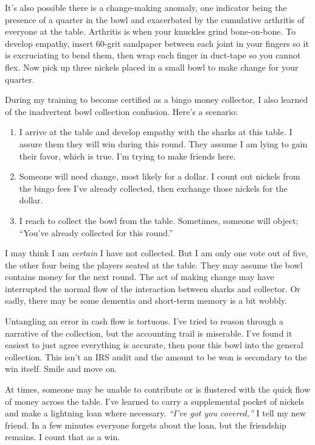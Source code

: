 \documentclass[
  letterpaper,
  DIV=11,
  numbers=noendperiod]{scrartcl}
\begin{document}
It's also possible there is a change-making anomaly, one indicator being
the presence of a quarter in the bowl and exacerbated by the cumulative
arthritis of everyone at the table. Arthritis is when your knuckles
grind bone-on-bone. To develop empathy, insert 60-grit sandpaper between
each joint in your fingers so it is excruciating to bend them, then wrap
each finger in duct-tape so you cannot flex. Now pick up three nickels
placed in a small bowl to make change for your quarter.

During my training to become certified as a bingo money collector, I
also learned of the inadvertent bowl collection confusion. Here's a
scenario:

\begin{enumerate}
\def\labelenumi{\arabic{enumi}.}
\item
  I arrive at the table and develop empathy with the sharks at this
  table. I assure them they will win during this round. They assume I am
  lying to gain their favor, which is true. I'm trying to make friends
  here.
\item
  Someone will need change, most likely for a dollar. I count out
  nickels from the bingo fees I've already collected, then exchange
  those nickels for the dollar.
\item
  I reach to collect the bowl from the table. Sometimes, someone will
  object; ``You've already collected for this round.''
\end{enumerate}

I may think I am \emph{certain} I have not collected. But I am only one
vote out of five, the other four being the players seated at the table.
They may assume the bowl contains money for the next round. The act of
making change may have interrupted the normal flow of the interaction
between sharks and collector. Or sadly, there may be some dementia and
short-term memory is a bit wobbly.

Untangling an error in cash flow is tortuous. I've tried to reason
through a narrative of the collection, but the accounting trail is
miserable. I've found it easiest to just agree everything is accurate,
then pour this bowl into the general collection. This isn't an IRS audit
and the amount to be won is secondary to the win itself. Smile and move
on.

At times, someone may be unable to contribute or is flustered with the
quick flow of money across the table. I've learned to carry a
supplemental pocket of nickels and make a lightning loan where
necessary. \emph{``I've got you covered,''} I tell my new friend. In a
few minutes everyone forgets about the loan, but the friendship remains.
I count that as a win.
\end{document}
